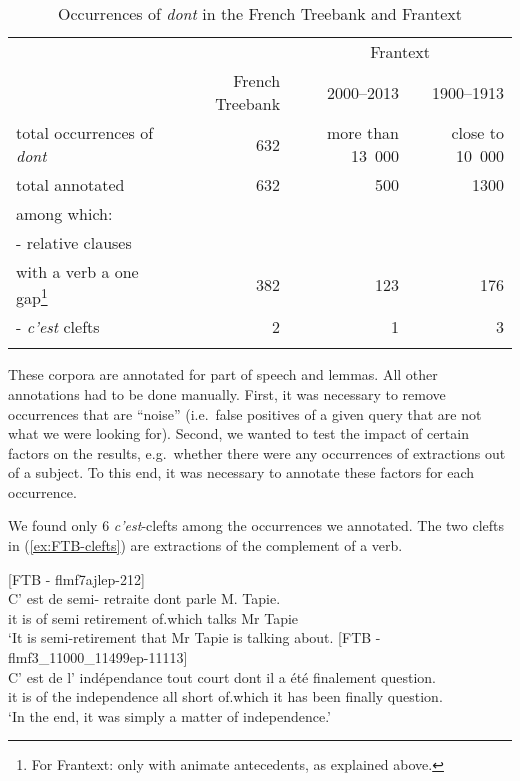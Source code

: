 \begin{table}[ht]
\small
    \begin{tabular}{lrrr}
         \lsptoprule
                           &                 & \multicolumn{2}{c}{Frantext}\\\cmidrule(lr){3-4}
                           & French Treebank &  2000--2013 & 1900--1913 \\
         \midrule
         total occurrences of \emph{dont} & 632 & more than 13~000 & close to 10~000 \\
         total annotated         & 632 & 500 & 1300 \\
         among which: & & & \\
         - relative clauses & &  & \\
         with a verb a one gap\footnote{For Frantext: only with animate antecedents, as explained above.} 
                                 & 382 & 123 & 176 \\
         - \emph{c'est} clefts   & 2 & 1 & 3 \\
         \lspbottomrule
    \end{tabular}
    \caption{Occurrences of \emph{dont} in the French Treebank and Frantext}
    \label{tab:dont-total}
\end{table}

These corpora are annotated for part of speech and lemmas. All other annotations had to be done manually. First, it was necessary to remove occurrences that are ``noise'' (i.e.\ false positives of a given query that are not what we were looking for). Second, we wanted to test the impact of certain factors on the results, e.g.\ whether there were any occurrences of extractions out of a subject. To this end, it was necessary to annotate these factors for each occurrence.

We found only 6 \emph{c'est}-clefts among the occurrences we annotated. The two clefts in (\ref{ex:FTB-clefts}) are extractions of the complement of a verb. 

\eal\label{ex:FTB-clefts}
\ex {}[FTB - flmf7ajlep-212]\\
\gll C' est de semi- retraite dont parle M. Tapie.\\
it is of semi retirement of.which talks Mr Tapie\\
\glt `It is semi-retirement that Mr Tapie is talking about.
\ex {}[FTB - flmf3\_11000\_11499ep-11113]\\
\gll C' est de l' indépendance tout court dont il a été finalement question.\\
it is of the independence all short of.which it has been finally question.\\
\glt `In the end, it was simply a matter of independence.'
\zl 

